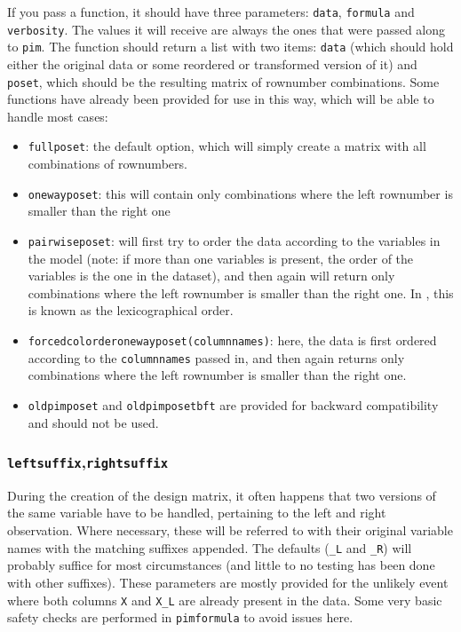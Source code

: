 \documentclass[12pt]{article}
\newcommand{\pim}[1]{\texttt{#1}}%
\newcommand{\cd}[1]{\texttt{#1}}%
\begin{document}
If you pass a function, it should have three parameters: \cd{data}, \cd{formula} and \cd{verbosity}. The values it will receive are always the ones that were passed along to \pim{pim}. The function should return a list with two items: \cd{data} (which should hold either the original data or some reordered or transformed version of it) and \cd{poset}, which should be the resulting matrix of rownumber combinations. Some functions have already been provided for use in this way, which will be able to handle most cases:
\begin{itemize}
	\item \pim{fullposet}: the default option, which will simply create a matrix with all combinations of rownumbers.
	\item \pim{onewayposet}: this will contain only combinations where the left rownumber is smaller than the right one
	\item \pim{pairwiseposet}: will first try to order the data according to the variables in the model (note: if more than one variables is present, the order of the variables is the one in the dataset), and then again will return only combinations where the left rownumber is smaller than the right one. In \cite{Thas2012}, this is known as the lexicographical order.
	\item \pim{forcedcolorderonewayposet}\cd{(columnnames)}: here, the data is first ordered according to the \cd{columnnames} passed in, and then again returns only combinations where the left rownumber is smaller than the right one.
	\item \pim{oldpimposet} and \pim{oldpimposetbft} are provided for backward compatibility and should not be used.
\end{itemize}
\subsubsection{\cd{leftsuffix},\cd{rightsuffix}}
During the creation of the design matrix, it often happens that two versions of the same variable have to be handled, pertaining to the left and right observation. Where necessary, these will be referred to with their original variable names with the matching suffixes appended. The defaults (\cd{\_L} and \cd{\_R}) will probably suffice for most circumstances (and little to no testing has been done with other suffixes). These parameters are mostly provided for the unlikely event where both columns \cd{X} and \cd{X\_L} are already present in the data. Some very basic safety checks are performed in \pim{pimformula} to avoid issues here.
\end{document}
